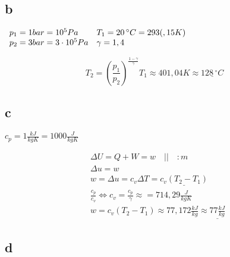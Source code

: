 \documentclass[12pt,a4paper,finnish]{article}
\begin{document}
\subsection{b}

\begin{math}
 \begin{array}{l l}
  p_1 = 1 bar = 10^5 Pa & T_1 = 20 \,^\circ C = 293(,15 K)\\
  p_2 = 3 bar = 3\cdot 10^5 Pa & \gamma = 1,4
 \end{array}
\end{math}

\begin{equation}
 T_2 = \left(\frac{p_1}{p_2}\right)^{\frac{1-\gamma}{\gamma}}T_1 \approx 401,04 K \approx \underline{128\,^\circ C}
\end{equation}

\subsection{c}

\begin{math}
 c_p = 1 \frac{kJ}{kgK} = 1000 \frac{J}{kgK}
\end{math}

\begin{align}
 &\Delta U = Q + W = w \quad\bigg|\bigg|\quad :m\\
 &\Delta u = w\\
 &w = \Delta u = c_v\Delta T = \underline{c_v(T_2 - T_1)}\\
 &\frac{c_p}{c_v} \Leftrightarrow c_v = \frac{c_p}{\gamma} \approx = 714,29 \frac{J}{kgK}\\
 &w = c_v(T_2 - T_1) \approx 77,172 \frac{kJ}{kg} \approx \underline{77 \frac{kJ}{kg}}
\end{align}

\subsection{d}
\end{document}
